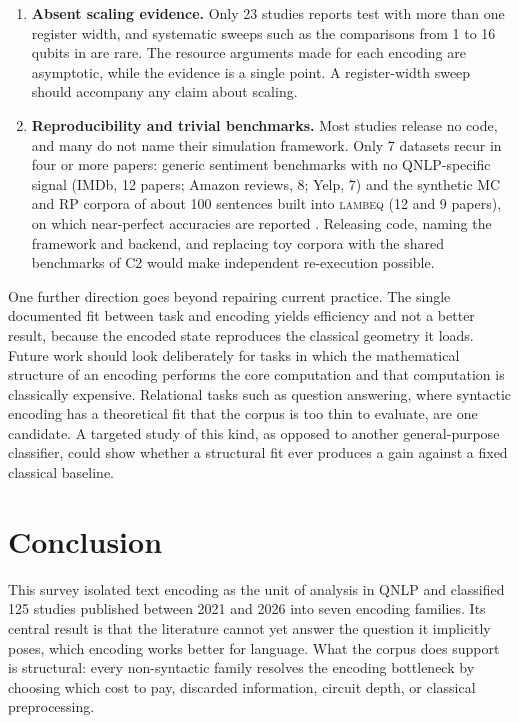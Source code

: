 \documentclass{ieeeaccess}
\begin{document}
\begin{enumerate}
\item[C4)] \textbf{Absent scaling evidence.} Only 23 studies reports test with more than one register width, and systematic sweeps such as the comparisons from 1 to 16 qubits in \cite{zhang_entangled_2024,kim_quantum_2025} are rare. The resource arguments made for each encoding are asymptotic, while the evidence is a single point. A register-width sweep should accompany any claim about scaling.

\item[C5)] \textbf{Reproducibility and trivial benchmarks.} Most studies release no code, and many do not name their simulation framework. Only 7 datasets recur in four or more papers: generic sentiment benchmarks with no QNLP-specific signal (IMDb, 12 papers; Amazon reviews, 8; Yelp, 7) and the synthetic MC and RP corpora of about 100 sentences built into \textsc{lambeq} (12 and 9 papers), on which near-perfect accuracies are reported \cite{lorenz_qnlp_2023,bouakba_ensemble_2023,liu_research_2024}. Releasing code, naming the framework and backend, and replacing toy corpora with the shared benchmarks of C2 would make independent re-execution possible.
\end{enumerate}

One further direction goes beyond repairing current practice. The single documented fit between task and encoding yields efficiency and not a better result, because the encoded state reproduces the classical geometry it loads. Future work should look deliberately for tasks in which the mathematical structure of an encoding performs the core computation and that computation is classically expensive. Relational tasks such as question answering, where syntactic encoding has a theoretical fit that the corpus is too thin to evaluate, are one candidate. A targeted study of this kind, as opposed to another general-purpose classifier, could show whether a structural fit ever produces a gain against a fixed classical baseline.

\section{Conclusion}
\label{sec:conclusion}

This survey isolated text encoding as the unit of analysis in QNLP and classified 125 studies published between 2021 and 2026 into seven encoding families. Its central result is that the literature cannot yet answer the question it implicitly poses, which encoding works better for language. What the corpus does support is structural: every non-syntactic family resolves the encoding bottleneck by choosing which cost to pay, discarded information, circuit depth, or classical preprocessing.
\end{document}

